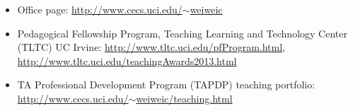 \begin{itemize}
\item Office page: \href{http://www.cecs.uci.edu/~weiweic}{http://www.cecs.uci.edu/$\sim$weiweic}
\item Pedagogical Fellowship Program, Teaching Learning and Technology Center (TLTC) UC Irvine: \href{http://www.tltc.uci.edu/pfProgram.html}{http://www.tltc.uci.edu/pfProgram.html}, 
\href{http://www.tltc.uci.edu/teachingAwards2013.html}{http://www.tltc.uci.edu/teachingAwards2013.html}
\item TA Professional Development Program (TAPDP) teaching portfolio: \href{http://www.cecs.uci.edu/~weiweic/teaching.html}{http://www.cecs.uci.edu/$\sim$weiweic/teaching.html}
\end{itemize}


